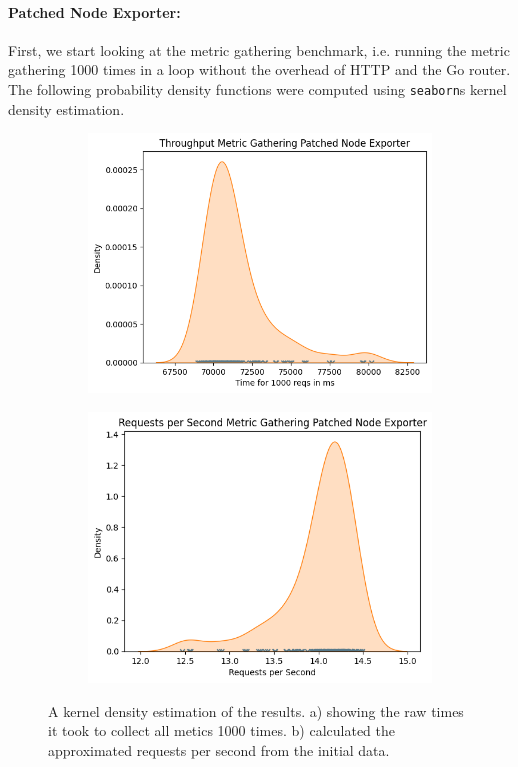 \paragraph{Patched Node Exporter:} First, we start looking at the metric gathering benchmark, i.e. running the metric gathering 1000 times in a loop without the overhead of HTTP and the Go router. The following probability density functions were computed using \texttt{seaborn}s kernel density estimation.
\begin{figure}[H]
\centering
\begin{subfigure}{.5\textwidth}
  \centering
  \includegraphics[width=\textwidth]{./plots/patched_node_exp_time_per_1000_reqs.png}
  \caption{}
\end{subfigure}%
\begin{subfigure}{.5\textwidth}
  \centering
  \includegraphics[width=\textwidth]{./plots/patched_node_exp_reqs_per_sec.png}
  \caption{}
\end{subfigure}
  \caption{A kernel density estimation of the results. a) showing the raw times it took to collect all metics 1000 times. b) calculated the approximated requests per second from the initial data.}
\end{figure}
